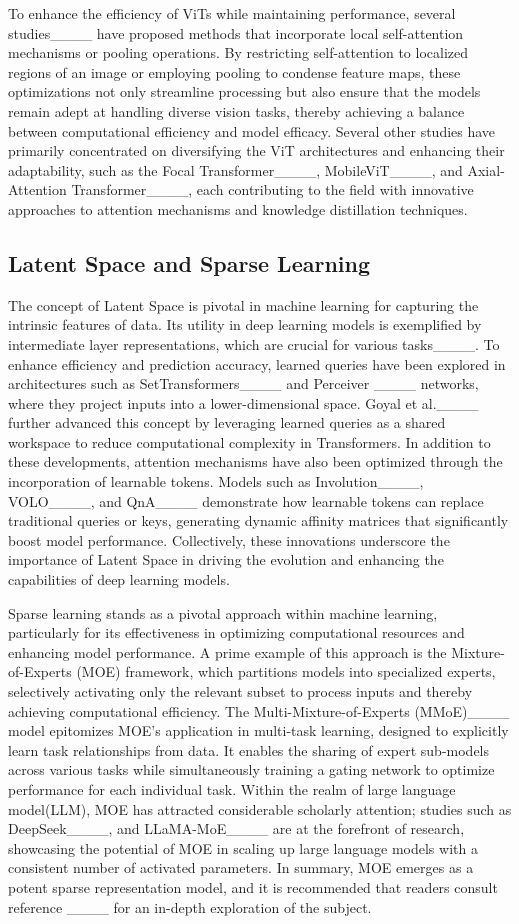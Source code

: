 To enhance the efficiency of ViTs while maintaining performance, several studies____ have proposed methods that incorporate local self-attention mechanisms or pooling operations. By restricting self-attention to localized regions of an image or employing pooling to condense feature maps, these optimizations not only streamline processing but also ensure that the models remain adept at handling diverse vision tasks, thereby achieving a balance between computational efficiency and model efficacy. Several other studies have primarily concentrated on diversifying the ViT architectures and enhancing their adaptability, such as the Focal Transformer____, MobileViT____, and Axial-Attention Transformer____, each contributing to the field with innovative approaches to attention mechanisms and knowledge distillation techniques.
\subsection{Latent Space and Sparse Learning}
The concept of Latent Space is pivotal in machine learning for capturing the intrinsic features of data. Its utility in deep learning models is exemplified by intermediate layer representations, which are crucial for various tasks____. To enhance efficiency and prediction accuracy, learned queries have been explored in architectures such as SetTransformers____ and Perceiver ____ networks, where they project inputs into a lower-dimensional space. Goyal et al.____ further advanced this concept by leveraging learned queries as a shared workspace to reduce computational complexity in Transformers. In addition to these developments, attention mechanisms have also been optimized through the incorporation of learnable tokens. Models such as Involution____, VOLO____, and QnA____ demonstrate how learnable tokens can replace traditional queries or keys, generating dynamic affinity matrices that significantly boost model performance. Collectively, these innovations underscore the importance of Latent Space in driving the evolution and enhancing the capabilities of deep learning models.

Sparse learning stands as a pivotal approach within machine learning, particularly for its effectiveness in optimizing computational resources and enhancing model performance. A prime example of this approach is the Mixture-of-Experts (MOE) framework, which partitions models into specialized experts, selectively activating only the relevant subset to process inputs and thereby achieving computational efficiency. The Multi-Mixture-of-Experts (MMoE)____ model epitomizes MOE's application in multi-task learning, designed to explicitly learn task relationships from data. It enables the sharing of expert sub-models across various tasks while simultaneously training a gating network to optimize performance for each individual task. Within the realm of large language model(LLM), MOE has attracted considerable scholarly attention; studies such as DeepSeek____, and LLaMA-MoE____ are at the forefront of research, showcasing the potential of MOE in scaling up large language models  with a consistent number of activated parameters. In summary, MOE emerges as a potent sparse representation model, and it is recommended that readers consult reference ____ for an in-depth exploration of the subject.